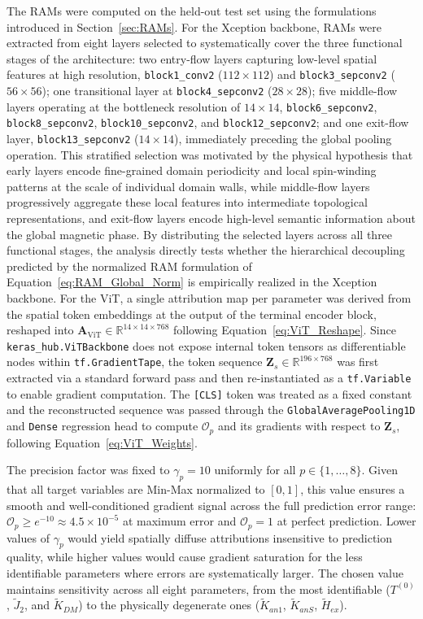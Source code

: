 \documentclass[final,5p,times,twocolumn]{elsarticle}
\begin{document}
The RAMs were computed on the held-out test set 
using the formulations introduced in 
Section~\ref{sec:RAMs}. For the Xception 
backbone, RAMs were extracted from eight layers 
selected to systematically cover the three 
functional stages of the architecture: two 
entry-flow layers capturing low-level spatial 
features at high resolution,  
\texttt{block1\_conv2} ($112\times112$) and 
\texttt{block3\_sepconv2} ($56\times56$); 
one transitional layer at 
\texttt{block4\_sepconv2} ($28\times28$); five 
middle-flow layers operating at the bottleneck 
resolution of $14\times14$,  
\texttt{block6\_sepconv2}, 
\texttt{block8\_sepconv2}, 
\texttt{block10\_sepconv2}, and 
\texttt{block12\_sepconv2}; and one 
exit-flow layer, \texttt{block13\_sepconv2} 
($14\times14$), immediately preceding the 
global pooling operation. This stratified 
selection was motivated by the physical 
hypothesis that early layers encode 
fine-grained domain periodicity and local 
spin-winding patterns at the scale of 
individual domain walls, while middle-flow 
layers progressively aggregate these local 
features into intermediate topological 
representations, and exit-flow layers encode 
high-level semantic information about the 
global magnetic phase. By distributing the 
selected layers across all three functional 
stages, the analysis directly tests whether 
the hierarchical decoupling predicted by the 
normalized RAM formulation of 
Equation~\ref{eq:RAM_Global_Norm} is 
empirically realized in the Xception backbone. For the 
ViT, a single attribution map per parameter 
was derived from the spatial token embeddings 
at the output of the terminal encoder block, 
reshaped into $\mathbf{A}_{\text{ViT}} \in 
\mathbb{R}^{14\times14\times768}$ following 
Equation~\ref{eq:ViT_Reshape}. Since 
\texttt{keras\_hub.ViTBackbone} does not expose 
internal token tensors as differentiable nodes 
within \texttt{tf.GradientTape}, the token 
sequence $\mathbf{Z}_s \in 
\mathbb{R}^{196\times768}$ was first extracted 
via a standard forward pass and then 
re-instantiated as a \texttt{tf.Variable} to 
enable gradient computation. The 
\texttt{[CLS]} token was treated as a fixed 
constant and the reconstructed sequence was 
passed through the \texttt{GlobalAveragePooling1D} 
and \texttt{Dense} regression head to compute 
$\mathcal{O}_p$ and its gradients with respect 
to $\mathbf{Z}_s$, following 
Equation~\ref{eq:ViT_Weights}.

The precision factor was fixed to 
$\gamma_p = 10$ uniformly for all 
$p \in \{1,\dots,8\}$. Given that all target 
variables are Min-Max normalized to $[0,1]$, 
this value ensures a smooth and well-conditioned 
gradient signal across the full prediction error 
range: $\mathcal{O}_p \geq e^{-10} \approx 
4.5\times10^{-5}$ at maximum error and 
$\mathcal{O}_p = 1$ at perfect prediction. 
Lower values of $\gamma_p$ would yield spatially 
diffuse attributions insensitive to prediction 
quality, while higher values would cause gradient 
saturation for the less identifiable parameters 
where errors are systematically larger. The 
chosen value maintains sensitivity across all 
eight parameters, from the most identifiable 
($T^{(0)}$, $\tilde{J}_2$, and $\tilde{K}_{DM}$) 
to the physically degenerate ones 
($\tilde{K}_{an1}$, $\tilde{K}_{anS}$, 
$\tilde{H}_{ex}$).
\end{document}

